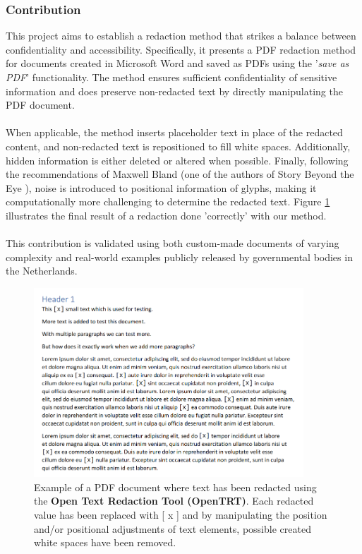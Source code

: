 \subsubsection{Contribution}
This project aims to establish a redaction method that strikes a balance between confidentiality and accessibility. Specifically, it presents a PDF redaction method for documents created in Microsoft Word and saved as PDFs using the '\textit{save as PDF}' functionality. The method ensures sufficient confidentiality of sensitive information and does preserve non-redacted text by directly manipulating the PDF document. 
\\\\
When applicable, the method inserts placeholder text in place of the redacted content, and non-redacted text is repositioned to fill white spaces. Additionally, hidden information is either deleted or altered when possible. Finally, following the recommendations of Maxwell Bland (one of the authors of Story Beyond the Eye \cite{bland2022story}), noise is introduced to positional information of glyphs, making it computationally more challenging to determine the redacted text. Figure \ref{fig:redactionExample} illustrates the final result of a redaction done 'correctly' with our method.
\\\\
This contribution is validated using both custom-made documents of varying complexity and real-world examples publicly released by governmental bodies in the Netherlands.

\begin{figure}[h]
\includegraphics[width=0.9\textwidth]{latex/media/before.png}
\centering
\caption{Example of a PDF document where text has been redacted using the \textbf{Open Text Redaction Tool (OpenTRT)}. Each redacted value has been replaced with [ x ] and by manipulating the position and/or positional adjustments of text elements, possible created white spaces have been removed.}
\label{fig:redactionExample}
\end{figure}


